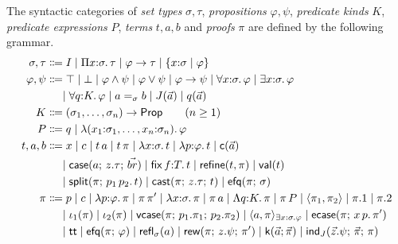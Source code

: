 \begin{definition}
\label{def:syntax}
The syntactic categories of \emph{set types} $\sigma, \tau$,
\emph{propositions} $\varphi, \psi$, \emph{predicate kinds} $K$,
\emph{predicate expressions} $P$, \emph{terms} $t, a, b$ and \emph{proofs}
$\pi$ are defined by the following grammar.
\begin{align*}
  \sigma, \tau &\Coloneqq
    I
    \mid \Pi x{:}\sigma.\,\tau
    \mid \varphi \to \tau
    \mid \refty{x{:}\sigma}{\varphi}
  \\
  \varphi, \psi &\Coloneqq
    \top \mid \bot
    \mid \varphi \wedge \psi
    \mid \varphi \vee \psi
    \mid \varphi \to \psi
    \mid \forall x{:}\sigma.\,\varphi
    \mid \exists x{:}\sigma.\,\varphi
  \\ &\mathrel{\phantom{\Coloneqq}}
    \mid \forall q{:}K.\,\varphi
    \mid a =_{\sigma} b
    \mid J(\tup{a})
    \mid q(\tup{a})
  \\
  K &\Coloneqq (\sigma_1, \dots, \sigma_n) \to \Prop \qquad (n \geq 1)
  \\
  P &\Coloneqq q \mid \lambda(x_1{:}\sigma_1, \dots, x_n{:}\sigma_n).\,\varphi
  \\
  t, a, b &\Coloneqq
    x
    \mid c
    \mid t\,a
    \mid t\,\pi
    \mid \lambda x{:}\sigma.\,t
    \mid \lambda p{:}\varphi.\,t
    \mid \wcns{c}(\tup{a})
  \\ &\mathrel{\phantom{\Coloneqq}}
    \mid \tcase{a}{z.\tau}{\tup{br}}
    \mid \tfix\,f{:}T.\,t
    \mid \trefine{t}{\pi}
    \mid \tval{t}
  \\ &\mathrel{\phantom{\Coloneqq}}
    \mid \tsplit{\pi}{p_1\,p_2.\,t}
    \mid \tcast{\pi}{z.\tau}{t}
    \mid \texfalso{\pi}{\sigma}
  \\
  \pi &\Coloneqq
    p
    \mid c
    \mid \lambda p{:}\varphi.\,\pi
    \mid \pi\,\pi'
    \mid \lambda x{:}\sigma.\,\pi
    \mid \pi\,a
    \mid \Lambda q{:}K.\,\pi
    \mid \pi\,P
    \mid \langle \pi_1, \pi_2 \rangle
    \mid \pi.1
    \mid \pi.2
  \\ &\mathrel{\phantom{\Coloneqq}}
    \mid \iota_1(\pi) \mid \iota_2(\pi)
    \mid \mathsf{vcase}(\pi;\, p_1.\pi_1;\, p_2.\pi_2)
    \mid \langle a, \pi \rangle_{\exists x{:}\sigma.\varphi}
    \mid \mathsf{ecase}(\pi;\, x\,p.\,\pi')
  \\ &\mathrel{\phantom{\Coloneqq}}
    \mid \mathsf{tt}
    \mid \texfalso{\pi}{\varphi}
    \mid \mathsf{refl}_{\sigma}(a)
    \mid \mathsf{rew}(\pi;\, z.\psi;\, \pi')
    \mid \wcns{k}(\tup{a}; \tup{\pi})
    \mid \tind{J}(\tup{z}.\psi;\, \tup{\pi};\, \pi)

\end{align*}
\end{definition}
